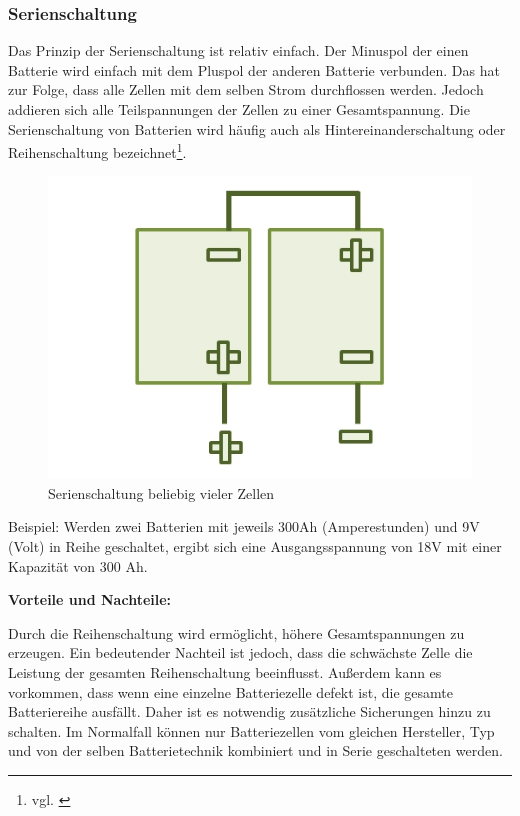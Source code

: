 \subsubsection{Serienschaltung}
Das Prinzip der Serienschaltung ist relativ einfach. Der Minuspol der einen Batterie wird einfach mit dem Pluspol der anderen Batterie verbunden. Das hat zur Folge, dass alle Zellen mit dem selben Strom durchflossen werden. Jedoch addieren sich alle Teilspannungen der Zellen zu einer Gesamtspannung. Die Serienschaltung von Batterien wird häufig auch als Hintereinanderschaltung oder Reihenschaltung bezeichnet\footnote{vgl. \cite{Seriensch}}.

\begin{figure}[H]
	\begin{center}
		\includegraphics[scale=1.0]{figures/Akku/SerienschaltungzweierBatterien.org.jpg}
		\caption{Serienschaltung beliebig vieler Zellen\cite{ReihenschaltungZellen}}
		\label{fig: Serienschaltung beliebig vieler Zellen}
	\end{center}
\end{figure}

Beispiel: Werden zwei Batterien mit jeweils 300Ah (Amperestunden) und 9V (Volt) in Reihe geschaltet, ergibt sich eine Ausgangsspannung von 18V mit einer Kapazität von 300 Ah. \medskip

\textbf{Vorteile und Nachteile:}

Durch die Reihenschaltung wird ermöglicht, höhere Gesamtspannungen zu erzeugen. Ein bedeutender Nachteil ist jedoch, dass die schwächste Zelle die Leistung der gesamten Reihenschaltung beeinflusst. Außerdem kann es vorkommen, dass wenn eine einzelne Batteriezelle defekt ist, die gesamte Batteriereihe ausfällt. Daher ist es notwendig zusätzliche Sicherungen hinzu zu schalten. Im Normalfall können nur Batteriezellen vom gleichen Hersteller, Typ und von der selben Batterietechnik kombiniert und in Serie geschalteten werden.
\newpage

